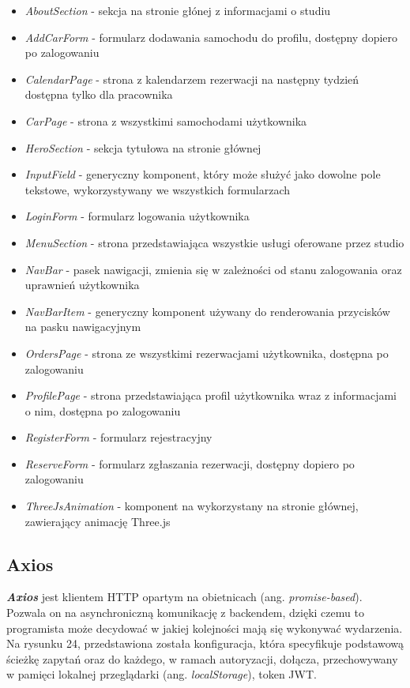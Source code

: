 \documentclass[11pt,a4paper]{article}
\begin{document}
\begin{itemize}
    \item \textsl{AboutSection} - sekcja na stronie głónej z informacjami o studiu
    \item \textsl{AddCarForm} - formularz dodawania samochodu do profilu, dostępny dopiero po zalogowaniu
    \item \textsl{CalendarPage} - strona z kalendarzem rezerwacji na następny tydzień dostępna tylko dla pracownika
    \item \textsl{CarPage} - strona z wszystkimi samochodami użytkownika
    \item \textsl{HeroSection} - sekcja tytułowa na stronie głównej
    \item \textsl{InputField} - generyczny komponent, który może służyć jako dowolne pole tekstowe, wykorzystywany we wszystkich formularzach
    \item \textsl{LoginForm} - formularz logowania użytkownika
    \item \textsl{MenuSection} - strona przedstawiająca wszystkie usługi oferowane przez studio
    \item \textsl{NavBar} - pasek nawigacji, zmienia się w zależności od stanu zalogowania oraz uprawnień użytkownika
    \item \textsl{NavBarItem} - generyczny komponent używany do renderowania przycisków na pasku nawigacyjnym
    \item \textsl{OrdersPage} - strona ze wszystkimi rezerwacjami użytkownika, dostępna po zalogowaniu
    \item \textsl{ProfilePage} - strona przedstawiająca profil użytkownika wraz z informacjami o nim, dostępna po zalogowaniu
    \item \textsl{RegisterForm} - formularz rejestracyjny
    \item \textsl{ReserveForm} - formularz zgłaszania rezerwacji, dostępny dopiero po zalogowaniu
    \item \textsl{ThreeJsAnimation} - komponent na wykorzystany na stronie głównej, zawierający animację Three.js
\end{itemize}

\subsection{Axios}
\textsl{\textbf{Axios}} \cite{axios} jest klientem HTTP opartym na obietnicach (ang. \textsl{promise-based}). Pozwala on na asynchroniczną komunikację z backendem, dzięki czemu to programista może decydować w jakiej kolejności mają się wykonywać wydarzenia. Na rysunku 24, przedstawiona została konfiguracja, która specyfikuje podstawową ścieżkę zapytań oraz do każdego, w ramach autoryzacji, dołącza, przechowywany w pamięci lokalnej przeglądarki (ang. \textsl{localStorage}), token JWT.
\end{document}
